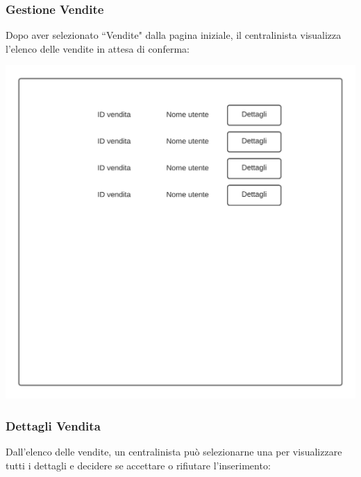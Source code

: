 \documentclass[12pt]{article}
\begin{document}
\newpage

\subsubsection{Gestione Vendite}
Dopo aver selezionato ``Vendite" dalla pagina iniziale, il centralinista visualizza l'elenco delle vendite in attesa di conferma:

\begin{center}
\includegraphics[height=0.3\textheight]{Mockup/Centralinista/ElencoVendite}
\end{center}

\subsubsection{Dettagli Vendita}
Dall'elenco delle vendite, un centralinista può selezionarne una per visualizzare tutti i dettagli e decidere se accettare o rifiutare l'inserimento:
\end{document}
